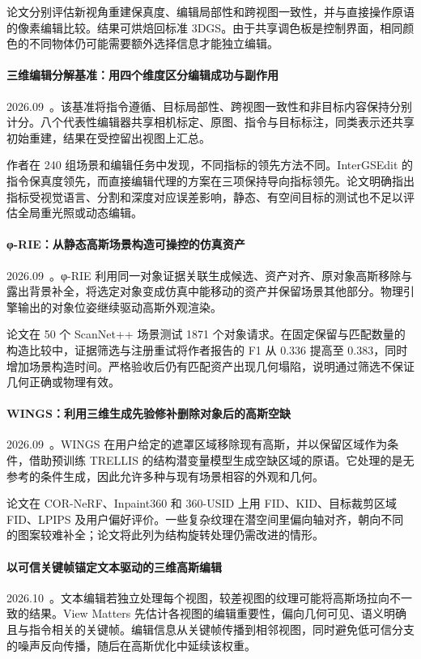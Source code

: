 论文分别评估新视角重建保真度、编辑局部性和跨视图一致性，并与直接操作原语的像素编辑比较。结果可烘焙回标准 3DGS。由于共享调色板是控制界面，相同颜色的不同物体仍可能需要额外选择信息才能独立编辑。

\paragraph{三维编辑分解基准：用四个维度区分编辑成功与副作用}
2026.09~\cite{2609_14899}。该基准将指令遵循、目标局部性、跨视图一致性和非目标内容保持分别计分。八个代表性编辑器共享相机标定、原图、指令与目标标注，同类表示还共享初始重建，结果在受控留出视图上汇总。

作者在 240 组场景和编辑任务中发现，不同指标的领先方法不同。InterGSEdit 的指令保真度领先，而直接编辑代理的方案在三项保持导向指标领先。论文明确指出指标受视觉语言、分割和深度对应误差影响，静态、有空间目标的测试也不足以评估全局重光照或动态编辑。

\paragraph{φ-RIE：从静态高斯场景构造可操控的仿真资产}
2026.09~\cite{2609_26795}。φ-RIE 利用同一对象证据关联生成候选、资产对齐、原对象高斯移除与露出背景补全，将选定对象变成仿真中能移动的资产并保留场景其他部分。物理引擎输出的对象位姿继续驱动高斯外观渲染。

论文在 50 个 ScanNet++ 场景测试 1871 个对象请求。在固定保留与匹配数量的构造比较中，证据筛选与注册重试将作者报告的 F1 从 0.336 提高至 0.383，同时增加场景构造时间。严格验收后仍有匹配资产出现几何塌陷，说明通过筛选不保证几何正确或物理有效。

\paragraph{WINGS：利用三维生成先验修补删除对象后的高斯空缺}
2026.09~\cite{2609_37816}。WINGS 在用户给定的遮罩区域移除现有高斯，并以保留区域作为条件，借助预训练 TRELLIS 的结构潜变量模型生成空缺区域的原语。它处理的是无参考的条件生成，因此允许多种与现有场景相容的外观和几何。

论文在 COR-NeRF、Inpaint360 和 360-USID 上用 FID、KID、目标裁剪区域 FID、LPIPS 及用户偏好评价。一些复杂纹理在潜空间里偏向轴对齐，朝向不同的图案较难补全；论文将此列为结构旋转处理仍需改进的情形。

\paragraph{以可信关键帧锚定文本驱动的三维高斯编辑}
2026.10~\cite{2610_08179}。文本编辑若独立处理每个视图，较差视图的纹理可能将高斯场拉向不一致的结果。View Matters 先估计各视图的编辑重要性，偏向几何可见、语义明确且与指令相关的关键帧。编辑信息从关键帧传播到相邻视图，同时避免低可信分支的噪声反向传播，随后在高斯优化中延续该权重。

